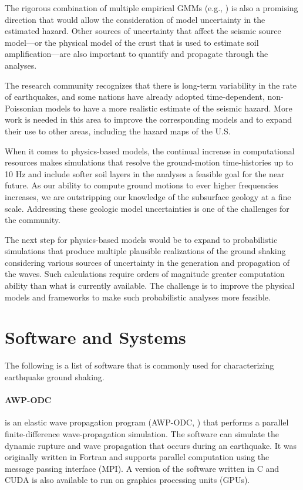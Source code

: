 The rigorous combination of multiple empirical GMMs (e.g., \cite{goulet2017ngaeast}) is also a promising direction that would allow the consideration of model uncertainty in the estimated hazard. Other sources of uncertainty that affect the seismic source model---or the physical model of the crust that is used to estimate soil amplification---are also important to quantify and propagate through the analyses. 

The research community recognizes that there is long-term variability in the rate of earthquakes, and some nations have already adopted time-dependent, non-Poissonian models to have a more realistic estimate of the seismic hazard. More work is needed in this area to improve the corresponding models and to expand their use to other areas, including the hazard maps of the U.S.

When it comes to physics-based models, the continual increase in computational resources makes simulations that resolve the ground-motion time-histories up to 10 Hz and include softer soil layers in the analyses a feasible goal for the near future. As our ability to compute ground motions to ever higher frequencies increases, we are outstripping our knowledge of the subsurface geology at a fine scale. Addressing these geologic model uncertainties is one of the challenges for the community.

The next step for physics-based models would be to expand to probabilistic simulations that produce multiple plausible realizations of the ground shaking considering various sources of uncertainty in the generation and propagation of the waves. Such calculations require orders of magnitude greater computation ability than what is currently available. The challenge is to improve the physical models and frameworks to make such probabilistic analyses more feasible.

\section{Software and Systems}
\label{sec:eq_shake_tools}

The following is a list of software that is commonly used for characterizing earthquake ground shaking.

\paragraph{AWP-ODC}  is an elastic wave propagation program (AWP-ODC, \cite{cui2010scalable}) that performs a parallel finite-difference wave-propagation simulation. The software can simulate the dynamic rupture and wave propagation that occurs during an earthquake. It was originally written in Fortran and supports parallel computation using the message passing interface (MPI). A version of the software written in C and CUDA is also available to run on graphics processing units (GPUs).

